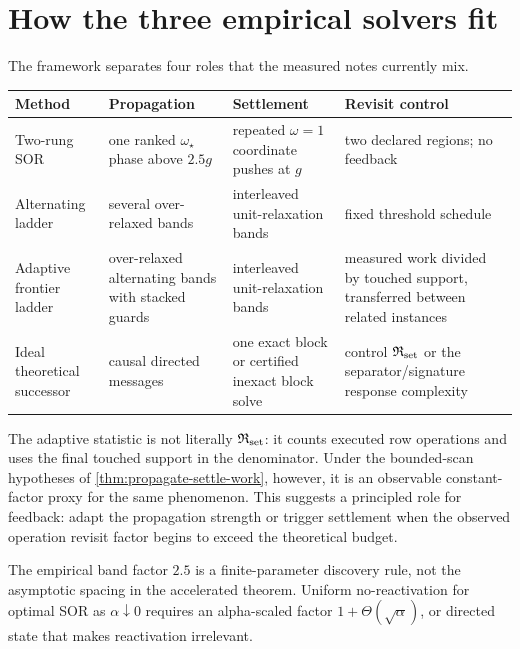 \section{How the three empirical solvers fit}
\label{sec:empirical-map}

The framework separates four roles that the measured notes currently mix.

\begin{center}
\small
\begin{tabularx}{\textwidth}{@{}p{}p{}p{}X@{}}
\toprule
Method & Propagation & Settlement & Revisit control \\
\midrule
Two-rung SOR & one ranked $\omega_\star$ phase above $2.5g$ & repeated
$\omega=1$ coordinate pushes at $g$ & two declared regions; no feedback \\
Alternating ladder & several over-relaxed bands & interleaved unit-relaxation
bands & fixed threshold schedule \\
Adaptive frontier ladder & over-relaxed alternating bands with stacked
guards & interleaved unit-relaxation bands & measured work divided by touched
support, transferred between related instances \\
Ideal theoretical successor & causal directed messages & one exact block or
certified inexact block solve & control $\mathfrak R_{\rm set}$ or the
separator/signature response complexity \\
\bottomrule
\end{tabularx}
\end{center}

The adaptive statistic is not literally
$\mathfrak R_{\rm set}$: it counts executed row operations and uses the final
touched support in the denominator.  Under the bounded-scan hypotheses of
\cref{thm:propagate-settle-work}, however, it is an observable constant-factor
proxy for the same phenomenon.  This suggests a principled role for feedback:
adapt the propagation strength or trigger settlement when the observed
operation revisit factor begins to exceed the theoretical budget.

The empirical band factor $2.5$ is a finite-parameter discovery rule, not the
asymptotic spacing in the accelerated theorem.  Uniform no-reactivation for
optimal SOR as $\alpha\downarrow0$ requires an alpha-scaled factor
$1+\Theta(\sqrt\alpha)$, or directed state that makes reactivation irrelevant.
